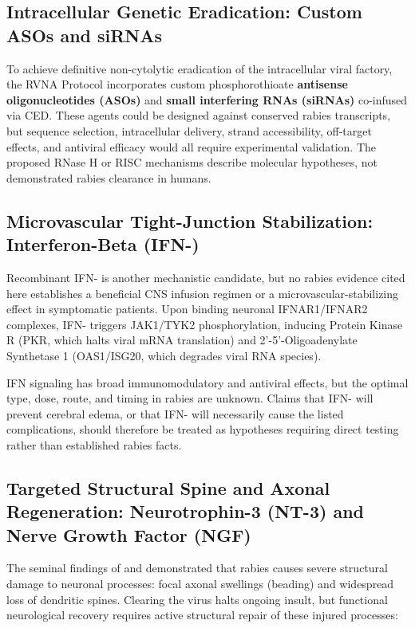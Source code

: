 \documentclass[12pt,a4paper]{article}
\begin{document}
\subsection{Intracellular Genetic Eradication: Custom ASOs and siRNAs}

To achieve definitive non-cytolytic eradication of the intracellular viral factory, the RVNA Protocol incorporates custom phosphorothioate \textbf{antisense oligonucleotides (ASOs)} and \textbf{small interfering RNAs (siRNAs)} co-infused via CED. These agents could be designed against conserved rabies transcripts, but sequence selection, intracellular delivery, strand accessibility, off-target effects, and antiviral efficacy would all require experimental validation. The proposed RNase H or RISC mechanisms describe molecular hypotheses, not demonstrated rabies clearance in humans.

\subsection{Microvascular Tight-Junction Stabilization: Interferon-Beta (IFN-\textbeta{})}

Recombinant IFN-\textbeta{} is another mechanistic candidate, but no rabies evidence cited here establishes a beneficial CNS infusion regimen or a microvascular-stabilizing effect in symptomatic patients. Upon binding neuronal IFNAR1/IFNAR2 complexes, IFN-\textbeta{} triggers JAK1/TYK2 phosphorylation, inducing Protein Kinase R (PKR, which halts viral mRNA translation) and 2'-5'-Oligoadenylate Synthetase 1 (OAS1/ISG20, which degrades viral RNA species).

IFN signaling has broad immunomodulatory and antiviral effects, but the optimal type, dose, route, and timing in rabies are unknown. Claims that IFN-\textbeta{} will prevent cerebral edema, or that IFN-\textgamma{} will necessarily cause the listed complications, should therefore be treated as hypotheses requiring direct testing rather than established rabies facts.

\subsection{Targeted Structural Spine and Axonal Regeneration: Neurotrophin-3 (NT-3) and Nerve Growth Factor (NGF)}

The seminal findings of \citet{scott2008rabies} and \citet{jackson2013pathogenesis} demonstrated that rabies causes severe structural damage to neuronal processes: focal axonal swellings (beading) and widespread loss of dendritic spines. Clearing the virus halts ongoing insult, but functional neurological recovery requires active structural repair of these injured processes:
\end{document}
